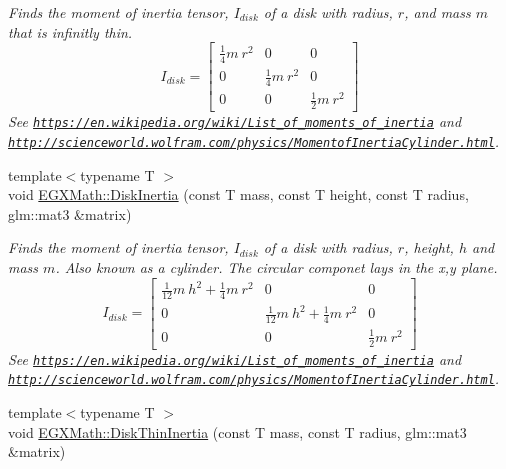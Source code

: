 \begin{DoxyCompactItemize}
\begin{DoxyCompactList}\small\item\em Finds the moment of inertia tensor, $I_{disk}$ of a disk with radius, $r$, and mass $m$ that is infinitly thin. \[ I_{disk}=\begin{bmatrix} \frac{1}{4}m\ r^2 & 0 & 0\\ 0 & \frac{1}{4}m\ r^2 & 0\\ 0 & 0 & \frac{1}{2}m\ r^2 \end{bmatrix} \] See \href{https://en.wikipedia.org/wiki/List_of_moments_of_inertia}{\tt https\+://en.\+wikipedia.\+org/wiki/\+List\+\_\+of\+\_\+moments\+\_\+of\+\_\+inertia} and \href{http://scienceworld.wolfram.com/physics/MomentofInertiaCylinder.html}{\tt http\+://scienceworld.\+wolfram.\+com/physics/\+Momentof\+Inertia\+Cylinder.\+html}. \end{DoxyCompactList}\item 
{\footnotesize template$<$typename T $>$ }\\void \mbox{\hyperlink{group___e_g_x_math-_geometry-3_d-_disk_ga72f4af6da7f192c5edb789ee2ec955f3}{E\+G\+X\+Math\+::\+Disk\+Inertia}} (const T mass, const T height, const T radius, glm\+::mat3 \&matrix)
\begin{DoxyCompactList}\small\item\em Finds the moment of inertia tensor, $I_{disk}$ of a disk with radius, $r$, height, $h$ and mass $m$. Also known as a cylinder. The circular componet lays in the x,y plane. \[ I_{disk}=\begin{bmatrix} \frac{1}{12}m\ h^2 + \frac{1}{4}m\ r^2 & 0 & 0\\ 0 & \frac{1}{12}m\ h^2 + \frac{1}{4}m\ r^2 & 0\\ 0 & 0 & \frac{1}{2}m\ r^2 \end{bmatrix} \] See \href{https://en.wikipedia.org/wiki/List_of_moments_of_inertia}{\tt https\+://en.\+wikipedia.\+org/wiki/\+List\+\_\+of\+\_\+moments\+\_\+of\+\_\+inertia} and \href{http://scienceworld.wolfram.com/physics/MomentofInertiaCylinder.html}{\tt http\+://scienceworld.\+wolfram.\+com/physics/\+Momentof\+Inertia\+Cylinder.\+html}. \end{DoxyCompactList}\item 
{\footnotesize template$<$typename T $>$ }\\void \mbox{\hyperlink{group___e_g_x_math-_geometry-3_d-_disk_gace6b474777a879fb16de3e480f6776ee}{E\+G\+X\+Math\+::\+Disk\+Thin\+Inertia}} (const T mass, const T radius, glm\+::mat3 \&matrix)

\end{DoxyCompactItemize}
